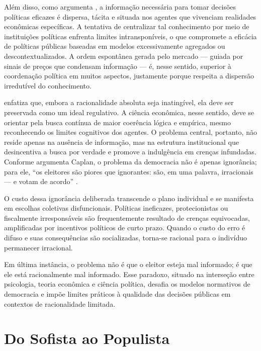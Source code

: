 Além disso, como argumenta , a informação necessária para tomar decisões políticas eficazes é dispersa, tácita e situada nos agentes que vivenciam realidades econômicas específicas. A tentativa de centralizar tal conhecimento por meio de instituições políticas enfrenta limites intransponíveis, o que compromete a eficácia de políticas públicas baseadas em modelos excessivamente agregados ou descontextualizados. A ordem espontânea gerada pelo mercado — guiada por sinais de preços que condensam informação — é, nesse sentido, superior à coordenação política em muitos aspectos, justamente porque respeita a dispersão irredutível do conhecimento.

 enfatiza que, embora a racionalidade absoluta seja inatingível, ela deve ser preservada como um ideal regulativo. A ciência econômica, nesse sentido, deve se orientar pela busca contínua de maior coerência lógica e empírica, mesmo reconhecendo os limites cognitivos dos agentes. O problema central, portanto, não reside apenas na ausência de informação, mas na estrutura institucional que desincentiva a busca por verdade e promove a indulgência em crenças infundadas. Conforme argumenta Caplan, o problema da democracia não é apenas ignorância; para ele, ``os eleitores são piores que ignorantes: são, em uma palavra, irracionais — e votam de acordo'' \cite[p.~2]{The_Myth_of_the_Rational_Voter}.

O custo dessa ignorância deliberada transcende o plano individual e se manifesta em escolhas coletivas disfuncionais. Políticas ineficazes, protecionistas ou fiscalmente irresponsáveis são frequentemente resultado de crenças equivocadas, amplificadas por incentivos políticos de curto prazo. Quando o custo do erro é difuso e suas consequências são socializadas, torna-se racional para o indivíduo permanecer irracional.

Em última instância, o problema não é que o eleitor esteja mal informado; é que ele está racionalmente mal informado. Esse paradoxo, situado na interseção entre psicologia, teoria econômica e ciência política, desafia os modelos normativos de democracia e impõe limites práticos à qualidade das decisões públicas em contextos de racionalidade limitada.

\section{Do Sofista ao Populista} %

